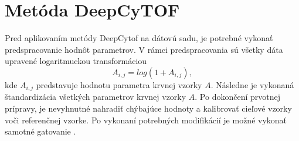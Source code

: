 \section{Metóda DeepCyTOF}

Pred aplikovaním metódy DeepCytof na dátovú sadu, je potrebné vykonať predspracovanie hodnôt parametrov. V rámci predspracovania sú všetky dáta upravené logaritmuckou transformáciou
\begin{equation}
    A_{i,j} = log(1+A_{i,j}),
\end{equation}
kde $A_{i,j}$ predstavuje hodnotu parametra krvnej vzorky $A$. Následne je vykonaná štandardizácia všetkých parametrov krvnej vzorky $A$. Po dokončení prvotnej prípravy, je nevyhnutné nahradiť chýbajúce hodnoty a kalibrovať cieľové vzorky voči referenčnej vzorke. Po vykonaní potrebných modifikácií je možné vykonať samotné gatovanie \cite{Li2017}. 

